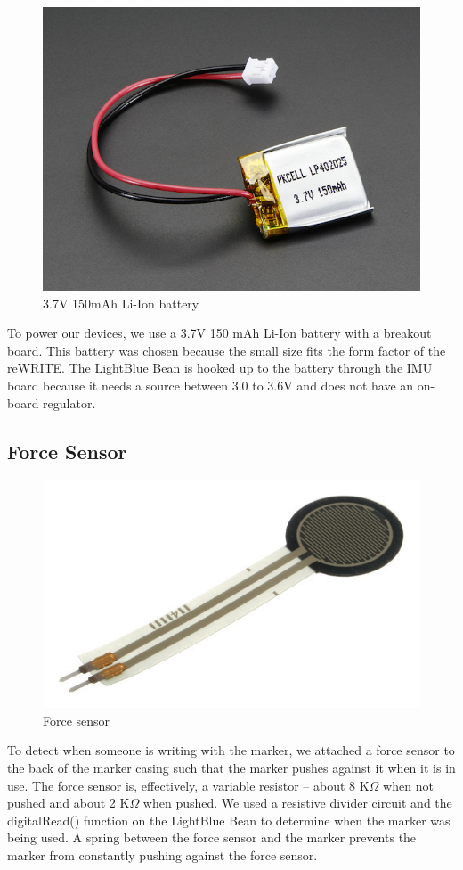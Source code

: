 \documentclass[12pt,journal]{IEEEtran}
\begin{document}
\begin{figure}[H]
  \centering
    \includegraphics[width=0.6\linewidth]{figures/battery}
  \caption{3.7V 150mAh Li-Ion battery}
  \label{fig:battery}
\end{figure}
  To power our devices, we use a 3.7V 150 mAh Li-Ion battery with a breakout board. This battery was chosen because the small size fits the form factor of the reWRITE. The LightBlue Bean is hooked up to the battery through the IMU board because it needs a source between 3.0 to 3.6V and does not have an on-board regulator.

\subsection{Force Sensor}

\begin{figure}[H]
  \centering
    \includegraphics[width=0.6\linewidth]{figures/force-sensor}
  \caption{Force sensor}
  \label{fig:system}
\end{figure}
  To detect when someone is writing with the marker, we attached a force sensor to the back of the marker casing such that the marker pushes against it when it is in use. The force sensor is, effectively, a variable resistor -- about 8 K$\Omega$ when not pushed and about 2 K$\Omega$ when pushed. We used a resistive divider circuit and the digitalRead() function on the LightBlue Bean to determine when the marker was being used. A spring between the force sensor and the marker prevents the marker from constantly pushing against the force sensor.
\end{document}
